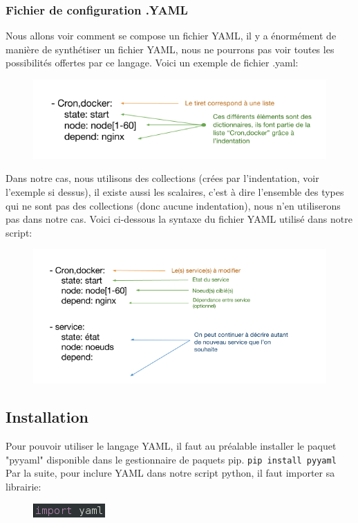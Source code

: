 \documentclass[a4paper,11pt]{article}
\begin{document}
\subsubsection{Fichier de configuration .YAML}
\label{subsub:4.2.2}
\noindent
Nous allons voir comment se compose un fichier YAML, il y a énormément de manière de synthétiser un fichier YAML, nous ne pourrons pas voir toutes les possibilités offertes par ce langage.
\smallbreak
\noindent
Voici un exemple de fichier .yaml:
\smallbreak
\begin{figure}[hbtp]
\centering
\includegraphics[scale=0.7]{syntaxe_yaml.png}
\end{figure}
\noindent
Dans notre cas, nous utilisons des collections (crées par l'indentation, voir l'exemple si dessus), il existe aussi les scalaires, c'est à dire l'ensemble des types qui ne sont pas des collections (donc aucune indentation), nous n'en utiliserons pas dans notre cas.
\smallbreak
\noindent
Voici ci-dessous la syntaxe du fichier YAML utilisé dans notre script:
\smallbreak
\begin{figure}[hbtp]
\centering
\includegraphics[scale=0.65]{syntaxe_yaml2.png}
\end{figure}
\pagebreak
 

\subsection{Installation}
\label{sub:4.3}
\noindent
Pour pouvoir utiliser le langage YAML, il faut au préalable installer le paquet "pyyaml" disponible dans le gestionnaire de paquets pip.
\smallbreak
\verb?pip install pyyaml?
\smallbreak
\noindent
Par la suite, pour inclure YAML dans notre script python, il faut importer sa librairie:
\smallbreak
\begin{figure}[hbtp]
\centering
\includegraphics[scale=0.7]{import_yaml.png}
\end{figure}
\smallbreak
\end{document}
